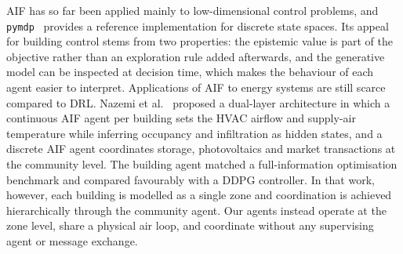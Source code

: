 \documentclass[conference]{IEEEtran}
\begin{document}
AIF has so far been applied mainly to low-dimensional control
problems, and \texttt{pymdp}~\cite{heins2022} provides a reference
implementation for discrete state spaces. Its appeal for building control
stems from two properties: the epistemic value is part of the objective rather
than an exploration rule added afterwards, and the generative model can be
inspected at decision time, which makes the behaviour of each agent easier to
interpret. Applications of AIF to energy systems are still
scarce compared to DRL. Nazemi et al.~\cite{nazemi2025} proposed a dual-layer architecture in
which a continuous AIF agent per building sets the HVAC airflow and
supply-air temperature while inferring occupancy and infiltration as hidden
states, and a discrete AIF agent coordinates storage, photovoltaics and market
transactions at the community level. The building agent matched a
full-information optimisation benchmark and compared favourably with a DDPG
controller. In that work, however, each building is modelled as a single zone
and coordination is achieved hierarchically through the community agent. Our
agents instead operate at the zone level, share a physical air loop, and
coordinate without any supervising agent or message exchange.

%


\end{document}

